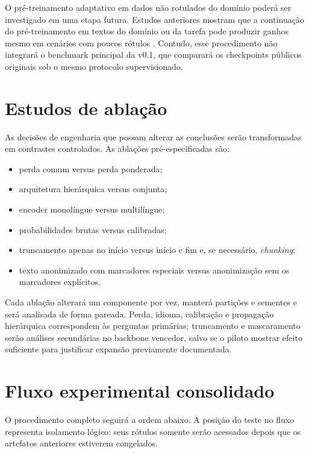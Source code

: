 O pré-treinamento adaptativo em dados não rotulados do domínio poderá ser
investigado em uma etapa futura. Estudos anteriores mostram que a continuação do
pré-treinamento em textos do domínio ou da tarefa pode produzir ganhos mesmo em
cenários com poucos rótulos \cite{gururangan2020dontstop}. Contudo, esse
procedimento não integrará o benchmark principal da v0.1, que comparará os
checkpoints públicos originais sob o mesmo protocolo supervisionado.

\section{Estudos de ablação}
\label{sec:ablacoes}

As decisões de engenharia que possam alterar as conclusões serão transformadas
em contrastes controlados. As ablações pré-especificadas são:

\begin{itemize}
    \item perda comum versus perda ponderada;
    \item arquitetura hierárquica versus conjunta;
    \item encoder monolíngue versus multilíngue;
    \item probabilidades brutas versus calibradas;
    \item truncamento apenas no início versus início e fim e, se necessário,
    \textit{chunking};
    \item texto anonimizado com marcadores especiais versus anonimização sem os
    marcadores explícitos.
\end{itemize}

Cada ablação alterará um componente por vez, manterá partições e sementes e será
analisada de forma pareada. Perda, idioma, calibração e propagação hierárquica
correspondem às perguntas primárias; truncamento e mascaramento serão análises
secundárias no backbone vencedor, salvo se o piloto mostrar efeito suficiente
para justificar expansão previamente documentada.

\section{Fluxo experimental consolidado}
\label{sec:fluxo-experimental}

O procedimento completo seguirá a ordem abaixo. A posição do teste no fluxo
representa isolamento lógico: seus rótulos somente serão acessados depois que os
artefatos anteriores estiverem congelados.

